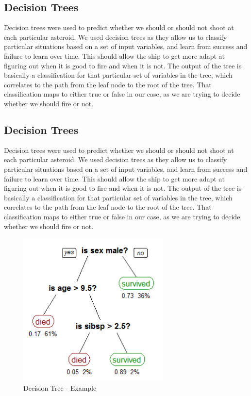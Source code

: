 \documentclass[10pt,draft,conference]{IEEEtran}
\begin{document}
\subsection{Decision Trees}
Decision trees were used to predict whether we should or should not shoot at each particular asteroid.  We used decision trees as they allow us to classify particular situations based on a set of input variables, and learn from success and failure to learn over time.  This should allow the ship to get more adapt at figuring out when it is good to fire and when it is not.  The output of the tree is basically a classification for that particular set of variables in the tree, which correlates to the path from the leaf node to the root of the tree.  That classification maps to either true or false in our case, as we are trying to decide whether we should fire or not.



\subsection{Decision Trees}
Decision trees were used to predict whether we should or should not shoot at each particular asteroid.  We used decision trees as they allow us to classify particular situations based on a set of input variables, and learn from success and failure to learn over time.  This should allow the ship to get more adapt at figuring out when it is good to fire and when it is not.  The output of the tree is basically a classification for that particular set of variables in the tree, which correlates to the path from the leaf node to the root of the tree.  That classification maps to either true or false in our case, as we are trying to decide whether we should fire or not.

\begin{figure}
\centering
\includegraphics[width=3.0in]{./CART_tree_titanic_survivors.png}
\caption{Decision Tree - Example\cite{titanic}}
\label{fig_decision_tree_example}
\end{figure}
\end{document}
